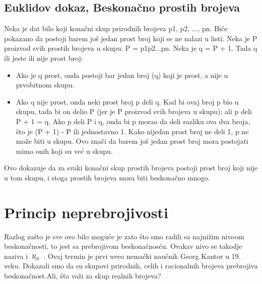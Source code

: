 \documentclass[a4paper]{article}
\begin{document}
\subsection{Euklidov dokaz, Beskonačno prostih brojeva}
Neka je dat bilo koji konačni skup prirodnih brojeva p1, p2, ..., pn. Biće pokazano da postoji barem još jedan prost broj koji se ne nalazi u listi. Neka je P proizvod svih prostih brojeva u skupu: P = p1p2...pn. Neka je q = P + 1. Tada q ili jeste ili nije prost broj:
\begin{itemize}
\item Ako je q prost, onda postoji bar jedan broj (q) koji je prost, a nije u prvobitnom skupu.
\item Ako q nije prost, onda neki prost broj p deli q. Kad bi ovaj broj p bio u skupu, tada bi on delio P (jer je P proizvod svih brojeva u skupu); ali p deli P + 1 = q. Ako p deli P i q, onda bi p morao da deli razliku
\cite{objasnjenje_deljenja} ova dva broja, što je (P + 1) - P ili jednostavno 1. Kako nijedan prost broj ne deli 1, p ne može biti u skupu. Ovo znači da barem još jedan prost broj mora postojati mimo onih koji su već u skupu.
\end{itemize} 

Ovo dokazuje da za svaki konačni skup prostih brojeva postoji prost broj koji nije u tom skupu, i stoga prostih brojeva mora biti beskonačno mnogo.

\section{Princip neprebrojivosti}
Razlog zašto je sve ovo bilo moguće je zato što smo radili sa najnižim nivoom beskonačnosti, to jest sa prebrojivom beskonačnosću. Ovakav nivo se takodje naziva i $\aleph_{0}$ .
Ovaj termin je prvi uveo nemački naučnik Georg Kantor u 19. veku. Dokazali smo da su skupovi prirodnih, celih i racionalnih brojeva prebrojiva beskonačnost.Ali, šta važi za skup realnih brojeva? 
\end{document}
